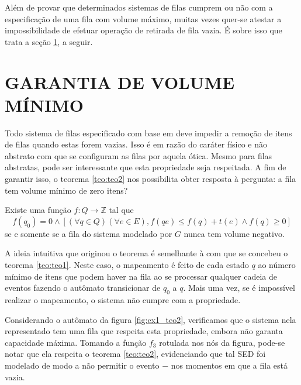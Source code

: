 Além de provar que determinados sistemas de filas cumprem ou não com a especificação de uma fila com volume máximo, muitas vezes quer-se atestar a impossibilidade de efetuar operação de retirada de fila vazia. É sobre isso que trata a seção \ref{sec:vol_min}, a seguir.

\section{GARANTIA DE VOLUME MÍNIMO}
\label{sec:vol_min}

Todo sistema de filas especificado com base em  deve impedir a remoção de itens de filas quando estas forem vazias. Isso é em razão do caráter físico e não abstrato com que se configuram as filas por aquela ótica. Mesmo para filas abstratas, pode ser interessante que esta propriedade seja respeitada. A fim de garantir isso, o teorema \ref{teo:teo2} nos possibilita obter resposta à pergunta: a fila tem volume mínimo de zero itens?

\begin{teo}
	\label{teo:teo2}
	Existe uma função $f : Q \to \mathbb{Z}$ tal que \begin{equation*}
	f(q_0) = 0 \wedge [(\forall q \in Q)(\forall e \in E), f(qe) \leq f(q) + t(e) \wedge f(q) \geq 0]
	\end{equation*} se e somente se a fila do sistema modelado por $G$ nunca tem volume negativo.
\end{teo}

A ideia intuitiva que originou o teorema é semelhante à com que se concebeu o teorema \ref{teo:teo1}. Neste caso, o mapeamento é feito de cada estado $q$ ao número mínimo de itens que podem haver na fila ao se processar qualquer cadeia de eventos fazendo o autômato transicionar de $q_0$ a $q$. Mais uma vez, se é impossível realizar o mapeamento, o sistema não cumpre com a propriedade.

Considerando o autômato da figura \ref{fig:ex1_teo2}, verificamos que o sistema nela representado tem uma fila que respeita esta propriedade, embora não garanta capacidade máxima. Tomando a função $f_3$ rotulada nos nós da figura, pode-se notar que ela respeita o teorema \ref{teo:teo2}, evidenciando que tal SED foi modelado de modo a não permitir o evento $-$ nos momentos em que a fila está vazia.


